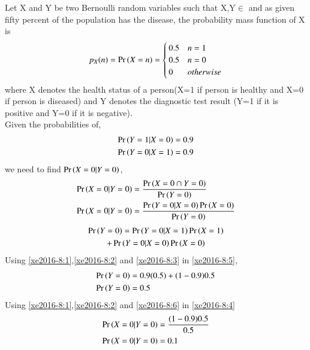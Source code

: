 Let X and Y be two Bernoulli random variables such that X,Y$\in$ and as given fifty percent of the population has the disease, the probability mass function of X is 
\begin{align}
    p_{X}(n) = \pr{X = n} = 
\begin{cases}
0.5 &  n=1
\\
0.5 & n=0
\\
0 & otherwise
\end{cases}\label{xe2016-8:1}
\end{align}
where X denotes the health status of a person(X=1 if person is healthy and X=0 if person is diseased) and Y denotes the diagnostic test result (Y=1 if it is positive and Y=0 if it is negative).
\\Given the probabilities of,
\begin{align}
    \pr{Y=1|X=0}=0.9\label{xe2016-8:2}
    \\\pr{Y=0|X=1}=0.9 \label{xe2016-8:3}
\end{align}
we need to find $\Pr\left(X=0|Y=0\right)$,
\begin{align}
    \pr{X=0|Y=0}&=\frac{\pr{X=0\cap Y=0}}{\pr{Y=0}}\\
    \pr{X=0|Y=0}&=\frac{\pr{Y=0|X=0}\pr{X=0}}{\pr{Y=0}}\label{xe2016-8:4}
\end{align}
\begin{multline}
    \pr{Y=0}=\pr{Y=0|X=1}\pr{X=1}\\+\pr{Y=0|X=0}\pr{X=0}\label{xe2016-8:5}
\end{multline}
Using \eqref{xe2016-8:1},\eqref{xe2016-8:2} and \eqref{xe2016-8:3} in \eqref{xe2016-8:5},
\begin{align}
    \nonumber\pr{Y=0}&=0.9(0.5)+(1-0.9)0.5\\
    \pr{Y=0}&= 0.5\label{xe2016-8:6}
\end{align}
Using \eqref{xe2016-8:1},\eqref{xe2016-8:2} and \eqref{xe2016-8:6} in \eqref{xe2016-8:4}
\begin{align}
    \Pr\left(X=0|Y=0\right)&=\frac{(1-0.9)0.5}{0.5}\\
    \Pr\left(X=0|Y=0\right)&= 0.1
\end{align}